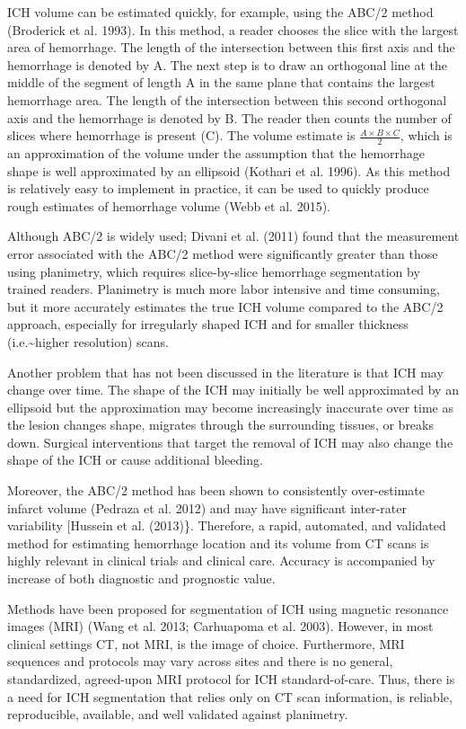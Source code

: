 \documentclass[]{elsarticle} %
\begin{document}
ICH volume can be estimated quickly, for example, using the ABC/2 method
(Broderick et al. 1993). In this method, a reader chooses the slice with
the largest area of hemorrhage. The length of the intersection between
this first axis and the hemorrhage is denoted by A. The next step is to
draw an orthogonal line at the middle of the segment of length A in the
same plane that contains the largest hemorrhage area. The length of the
intersection between this second orthogonal axis and the hemorrhage is
denoted by B. The reader then counts the number of slices where
hemorrhage is present (C). The volume estimate is
\(\frac{A\times B\times C}{2}\), which is an approximation of the volume
under the assumption that the hemorrhage shape is well approximated by
an ellipsoid (Kothari et al. 1996). As this method is relatively easy to
implement in practice, it can be used to quickly produce rough estimates
of hemorrhage volume (Webb et al. 2015).

Although ABC/2 is widely used; Divani et al. (2011) found that the
measurement error associated with the ABC/2 method were significantly
greater than those using planimetry, which requires slice-by-slice
hemorrhage segmentation by trained readers. Planimetry is much more
labor intensive and time consuming, but it more accurately estimates the
true ICH volume compared to the ABC/2 approach, especially for
irregularly shaped ICH and for smaller thickness
(i.e.\textasciitilde{}higher resolution) scans.

Another problem that has not been discussed in the literature is that
ICH may change over time. The shape of the ICH may initially be well
approximated by an ellipsoid but the approximation may become
increasingly inaccurate over time as the lesion changes shape, migrates
through the surrounding tissues, or breaks down. Surgical interventions
that target the removal of ICH may also change the shape of the ICH or
cause additional bleeding.

Moreover, the ABC/2 method has been shown to consistently over-estimate
infarct volume (Pedraza et al. 2012) and may have significant
inter-rater variability {[}Hussein et al. (2013)\}. Therefore, a rapid,
automated, and validated method for estimating hemorrhage location and
its volume from CT scans is highly relevant in clinical trials and
clinical care. Accuracy is accompanied by increase of both diagnostic
and prognostic value.

Methods have been proposed for segmentation of ICH using magnetic
resonance images (MRI) (Wang et al. 2013; Carhuapoma et al. 2003).
However, in most clinical settings CT, not MRI, is the image of choice.
Furthermore, MRI sequences and protocols may vary across sites and there
is no general, standardized, agreed-upon MRI protocol for ICH
standard-of-care. Thus, there is a need for ICH segmentation that relies
only on CT scan information, is reliable, reproducible, available, and
well validated against planimetry.
\end{document}
